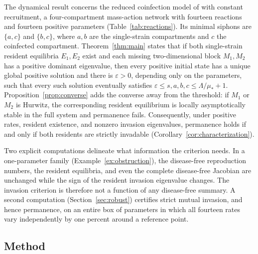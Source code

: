\documentclass[11pt,a4paper]{article}
\theoremstyle{plain}
\theoremstyle{definition}
\theoremstyle{remark}
\newcommand{\eps}{\varepsilon}
\begin{document}
The dynamical result concerns the reduced coinfection model of \citep[Section~6]{AvramAdenaneBasnarkovHorvath2025} with constant recruitment, a four-compartment mass-action network with fourteen reactions and fourteen positive parameters (Table~\ref{tab:reactions}). Its minimal siphons are $\{a,c\}$ and $\{b,c\}$, where $a,b$ are the single-strain compartments and $c$ the coinfected compartment. Theorem~\ref{thm:main} states that if both single-strain resident equilibria $E_1,E_2$ exist and each missing two-dimensional block $M_1,M_2$ has a positive dominant eigenvalue, then every positive initial state has a unique global positive solution and there is $\eps>0$, depending only on the parameters, such that every such solution eventually satisfies $\eps\le s,a,b,c\le\Lambda/\mu_*+1$. Proposition~\ref{prop:converse} adds the converse away from the threshold: if $M_1$ or $M_2$ is Hurwitz, the corresponding resident equilibrium is locally asymptotically stable in the full system and permanence fails. Consequently, under positive rates, resident existence, and nonzero invasion eigenvalues, permanence holds if and only if both residents are strictly invadable (Corollary~\ref{cor:characterization}).

Two explicit computations delineate what information the criterion needs. In a one-parameter family (Example~\ref{ex:obstruction}), the disease-free reproduction numbers, the resident equilibria, and even the complete disease-free Jacobian are unchanged while the sign of the resident invasion eigenvalue changes. The invasion criterion is therefore not a function of any disease-free summary. A second computation (Section~\ref{sec:robust}) certifies strict mutual invasion, and hence permanence, on an entire box of parameters in which all fourteen rates vary independently by one percent around a reference point.

\subsection{Method}
\end{document}
